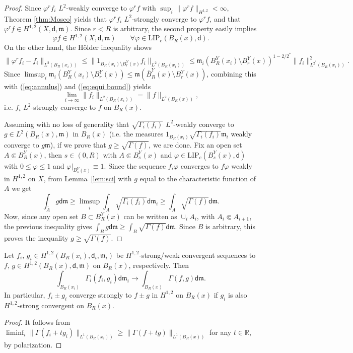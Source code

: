 \documentclass[a4paper,11pt,reqno]{article}
\numberwithin{equation}{section}
\theoremstyle{plain}
\theoremstyle{definition}
\theoremstyle{remark}
\let\altphi\phi
\let\phi\varphi
\let\varphi\altphi
\let\altphi\undefined
\newcommand{\dist}{\mathsf{d}}
\newcommand{\meas}{\mathfrak{m}}
\begin{document}
{\begin{proof}
Since $\phi^rf_i$ $L^2$-weakly converge to $\phi^rf$ with $\sup_i\|\phi^rf\|_{H^{1, 2}}<\infty$, 
Theorem \ref{thm:Mosco} yields that $\phi^rf_i$ $L^2$-strongly converge to $\phi^rf$, 
and that $\phi^rf \in H^{1, 2}(X, \dist, \meas)$. Since $r<R$ is arbitrary, the second property easily implies
$$
\phi f \in H^{1, 2}(X, \dist, \meas)\qquad \forall \phi \in \mathrm{LIP}_c(B_R(x), \dist).
$$
On the other hand, the H\"older inequality shows 
$$
\|\phi^rf_i-f_i\|_{L^2(B_R(x_i))} \le \| 1_{B_R(x_i) \setminus B^Y_r(x)}f_i\|_{L^2(B_R(x_i))} \le 
\meas_i(B^Y_R(x_i) \setminus B^Y_r(x))^{1-2/2^*}\|f_i\|_{L^{2^*}(B_R(x_i))}^2.
$$
Since $\limsup_i\meas_i(B^Y_R(x_i) \setminus B^Y_r(x))\leq\meas(\overline{B}^Y_R(x) \setminus B^Y_r(x))$, 
combining this with (\ref{eq:annulus}) and (\ref{eq:equi bound}) yields 
\begin{equation}\label{eq:conv l2 norm}
\lim_{i \to \infty}\|f_i\|_{L^2(B_R(x_i))}=\|f\|_{L^2(B_R(x))},
\end{equation}
i.e.  $f_i$ $L^2$-strongly converge to $f$ on $B_R(x)$.

Assuming with no loss of generality that $\sqrt{\Gamma_i(f_i)}$ $L^2$-weakly converge to $g\in L^2(B_R(x),\meas)$ in $B_R(x)$
(i.e. the measures $1_{B_R(x_i)}\sqrt{\Gamma_i(f_i)}\meas_i$ weakly converge to
$g\meas$), if we 
prove that $g\geq\sqrt{\Gamma(f)}$, we are done. Fix an open set $A\Subset B_R^Y(x)$, then $s\in (0,R)$ with
$A\Subset B_s^Y(x)$ and $\phi\in \mathrm{LIP}_c(B_s^Y(x), \dist)$ with $0 \le \phi \le 1$ and
$\phi\vert_{B_s^Y(x)}\equiv 1$.
Since the sequence $f_i\phi$ converges to $f\phi$ weakly in $H^{1,2}$ on $X$, from Lemma~\ref{lem:sci} with
$g$ equal to the characteristic function of $A$ we get
$$
\int_{\overline{A}}g\dist\meas\geq\limsup_i\int_A\sqrt{\Gamma_i(f_i)}\dist\meas_i\geq\int_A\sqrt{\Gamma(f)}\dist\meas.
$$
Now, since any open set $B\subset B_R^Y(x)$ can be written as $\cup_i A_i$, with $A_i\Subset A_{i+1}$, the
previous inequality gives $\int_Bg\dist\meas\geq\int_B\sqrt{\Gamma(f)}\dist\meas$. Since $B$ is arbitrary,
this proves the inequality $g\geq\sqrt{\Gamma(f)}$.
\end{proof}

\begin{corollary}\label{cor:conv}
Let $f_i, \,g_i  \in H^{1, 2}(B_R(x_i), \dist_i, \meas_i)$ be $H^{1, 2}$-strong/weak convergent sequences to 
$f, \,g \in H^{1, 2}(B_R(x), \dist, \meas)$ on $B_R(x)$, respectively. Then 
\begin{equation}\label{eq:6}
\int_{B_R(x_i)}\Gamma_i( f_i, g_i) \dist \meas_i \to \int_{B_R(x)}\Gamma(f,g) \dist \meas.
\end{equation}
In particular, $f_i \pm g_i$ converge strongly to $f \pm g$ in $H^{1, 2}$ on $B_R(x)$ if $g_i$ is also $H^{1, 2}$-strong convergent on $B_R(x)$.
\end{corollary} 
\begin{proof}
It follows from $\liminf_i\|\Gamma (f_i +t g_i)\|_{L^1(B_R(x_i))} \ge \|\Gamma(f +t g)\|_{L^1(B_R(x))}$ for any $t \in \mathbb{R}$,
by polarization.
\end{proof}


}
\end{document}

